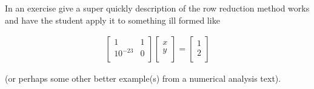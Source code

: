 In an exercise give a super quickly description of the row reduction method works and have the student apply it to something ill formed like

\begin{align*}
\begin{bmatrix}
1 & 1 \\
10^{-23} & 0 \\
\end{bmatrix}
\begin{bmatrix}
x \\
y \\
\end{bmatrix}
=
\begin{bmatrix}
1 \\
2 \\
\end{bmatrix}
\end{align*}

(or perhaps some other better example(s) from a numerical analysis text).

%
%

%
